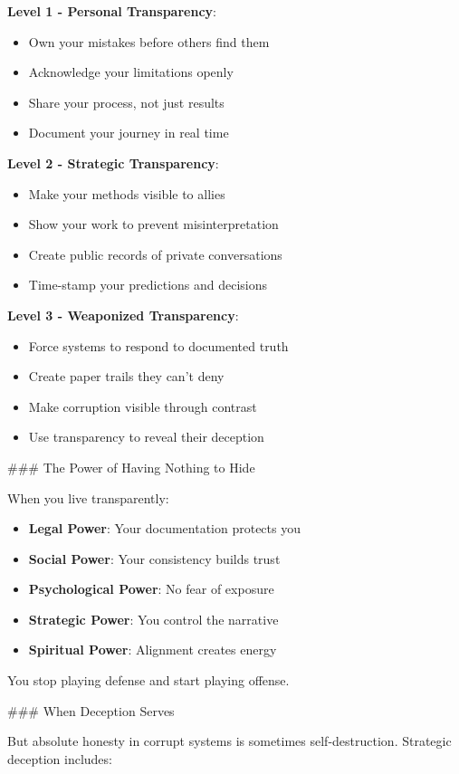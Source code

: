 \documentclass[12pt]{book}
\begin{document}
\textbf{Level 1 - Personal Transparency}:
\begin{itemize}
\item Own your mistakes before others find them
\item Acknowledge your limitations openly
\item Share your process, not just results
\item Document your journey in real time

\end{itemize}
\textbf{Level 2 - Strategic Transparency}:
\begin{itemize}
\item Make your methods visible to allies
\item Show your work to prevent misinterpretation
\item Create public records of private conversations
\item Time-stamp your predictions and decisions

\end{itemize}
\textbf{Level 3 - Weaponized Transparency}:
\begin{itemize}
\item Force systems to respond to documented truth
\item Create paper trails they can't deny
\item Make corruption visible through contrast
\item Use transparency to reveal their deception

\end{itemize}
\#\#\# The Power of Having Nothing to Hide

When you live transparently:

\begin{itemize}
\item \textbf{Legal Power}: Your documentation protects you
\item \textbf{Social Power}: Your consistency builds trust
\item \textbf{Psychological Power}: No fear of exposure
\item \textbf{Strategic Power}: You control the narrative
\item \textbf{Spiritual Power}: Alignment creates energy

\end{itemize}
You stop playing defense and start playing offense.

\#\#\# When Deception Serves

But absolute honesty in corrupt systems is sometimes self-destruction. Strategic deception includes:
\end{document}
